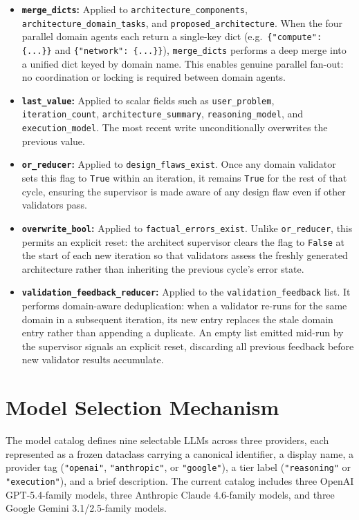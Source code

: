 \begin{itemize}
    \item \textbf{\texttt{merge\_dicts}:} Applied to \texttt{architecture\_components}, \texttt{architecture\_domain\_tasks}, and \texttt{proposed\_architecture}. When the four parallel domain agents each return a single-key dict (e.g.\ \texttt{\{"compute": \{...\}\}} and \texttt{\{"network": \{...\}\}}), \texttt{merge\_dicts} performs a deep merge into a unified dict keyed by domain name. This enables genuine parallel fan-out: no coordination or locking is required between domain agents.
    \item \textbf{\texttt{last\_value}:} Applied to scalar fields such as \texttt{user\_problem}, \texttt{iteration\_count}, \texttt{architecture\_summary}, \texttt{reasoning\_model}, and \texttt{execution\_model}. The most recent write unconditionally overwrites the previous value.
    \item \textbf{\texttt{or\_reducer}:} Applied to \texttt{design\_flaws\_exist}. Once any domain validator sets this flag to \texttt{True} within an iteration, it remains \texttt{True} for the rest of that cycle, ensuring the supervisor is made aware of any design flaw even if other validators pass.
    \item \textbf{\texttt{overwrite\_bool}:} Applied to \texttt{factual\_errors\_exist}. Unlike \texttt{or\_reducer}, this permits an explicit reset: the architect supervisor clears the flag to \texttt{False} at the start of each new iteration so that validators assess the freshly generated architecture rather than inheriting the previous cycle's error state.
    \item \textbf{\texttt{validation\_feedback\_reducer}:} Applied to the \texttt{validation\_feedback} list. It performs domain-aware deduplication: when a validator re-runs for the same domain in a subsequent iteration, its new entry replaces the stale domain entry rather than appending a duplicate. An empty list emitted mid-run by the supervisor signals an explicit reset, discarding all previous feedback before new validator results accumulate.
\end{itemize}

\section{Model Selection Mechanism}

The model catalog defines nine selectable LLMs across three providers, each represented as a frozen dataclass carrying a canonical identifier, a display name, a provider tag (\texttt{"openai"}, \texttt{"anthropic"}, or \texttt{"google"}), a tier label (\texttt{"reasoning"} or \texttt{"execution"}), and a brief description. The current catalog includes three OpenAI GPT-5.4-family models, three Anthropic Claude 4.6-family models, and three Google Gemini 3.1/2.5-family models.

